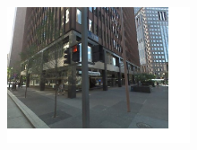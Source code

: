 \begin{minipage}{1.0\linewidth}
\end{minipage}
\begin{minipage}{0.34\linewidth}
    \centering
    \vspace{5mm}
    \includegraphics[height=40mm]{imgs/ex1/query.jpg}
\end{minipage}
